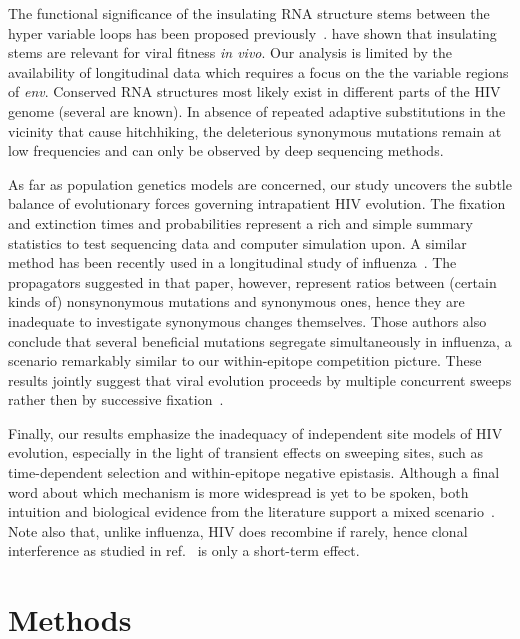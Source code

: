 \documentclass[rmp, twocolumn]{revtex4}
\newcommand{\env}{\textit{env}}
\begin{document}
The functional significance of the insulating RNA structure stems between the
hyper variable loops has been proposed
previously~\citep{watts_architecture_2009, sanjuan_interplay_2011}.
\citet{sanjuan_interplay_2011} have shown that insulating stems are relevant for
viral fitness {\it in vivo}. Our analysis is limited by the availability of
longitudinal data which requires a focus on the the variable regions of \env.
Conserved RNA structures most likely exist in different parts
of the HIV genome (several are known). In absence of repeated adaptive substitutions in the vicinity
that cause hitchhiking, the deleterious synonymous mutations remain at low
frequencies and can only be observed by deep sequencing methods. 

As far as population genetics models are concerned, our study uncovers the
subtle balance of evolutionary forces governing intrapatient HIV evolution. The
fixation and extinction times and probabilities represent a rich and simple
summary statistics to test sequencing data and computer simulation upon. A
similar method has been recently used in a longitudinal study of
influenza~\citep{strelkowa_clonal_2012}. The propagators suggested in that
paper, however, represent ratios between (certain kinds of) nonsynonymous
mutations and synonymous ones, hence they are inadequate to investigate
synonymous changes themselves. Those authors also conclude that several
beneficial mutations segregate simultaneously in influenza, a scenario
remarkably similar to our within-epitope competition picture. These results
jointly suggest that viral evolution proceeds by multiple concurrent sweeps
rather then by successive fixation~\citep{desai_beneficial_2007, neher_rate_2010}.

Finally, our results emphasize the inadequacy of independent site
models of HIV evolution, especially in the light of transient effects on
sweeping sites, such as time-dependent selection and within-epitope negative
epistasis. Although a final word about which mechanism is more
widespread is yet to be spoken, both intuition and biological evidence from the
literature support a mixed scenario~\citep{richman_rapid_2003,
moore_limited_2009, bar_early_2012}. Note also that, unlike influenza, HIV does
recombine if rarely, hence clonal interference as studied in
ref.~\citep{strelkowa_clonal_2012} is only a short-term effect.

\section{Methods}
\end{document}
